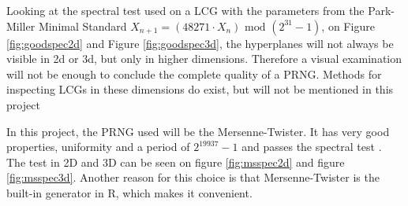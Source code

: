 \noindent Looking at the spectral test used on a LCG with the parameters from the Park-Miller Minimal Standard\:  $X_{n+1}=(48271\cdot X_{n}) \text{ mod } (2^{31}-1)$\cite{knuth}, on Figure \ref{fig:goodspec2d} and Figure \ref{fig:goodspec3d}, the hyperplanes will not always be visible in 2d or 3d, but only in higher dimensions. Therefore a visual examination will not be enough to conclude the complete quality of a PRNG. Methods for inspecting LCGs in these dimensions do exist, but will not be mentioned in this project
\newline

\noindent In this project, the PRNG used will be the Mersenne-Twister. It has very good properties, uniformity and a period of $2^{19937}-1$ and passes the spectral test \cite{mersenne}. The test in 2D and 3D can be seen on figure \ref{fig:msspec2d} and figure \ref{fig:msspec3d}. Another reason for this choice is that Mersenne-Twister is the built-in generator in R, which makes it convenient. 


